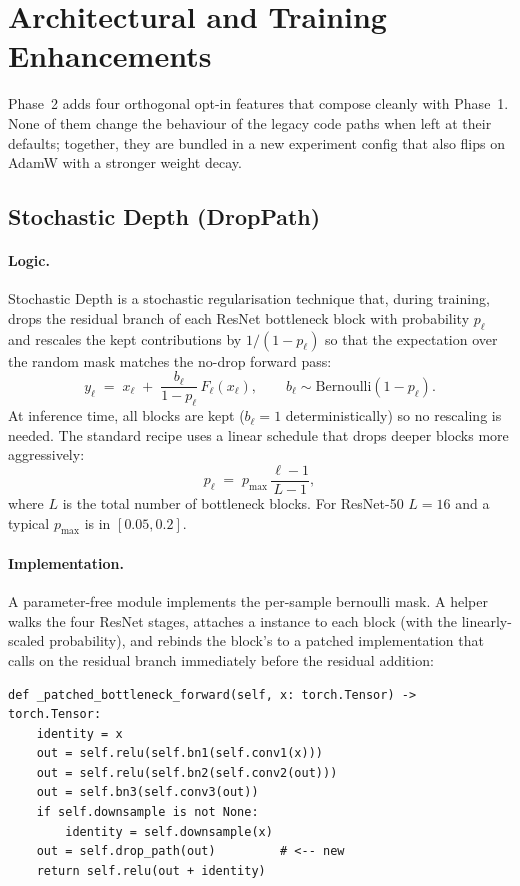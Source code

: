 \section{Architectural and Training Enhancements}
\label{sec:phase2}

Phase~2 adds four orthogonal opt-in features that compose cleanly with
Phase~1. None of them change the behaviour of the legacy code paths when
left at their defaults; together, they are bundled in a new experiment
config  that also flips on
AdamW with a stronger weight decay.

\subsection{Stochastic Depth (DropPath)}
\label{sec:phase2:droppath}

\paragraph{Logic.} Stochastic Depth \cite{Huang2016SD} is a stochastic
regularisation technique that, during training, drops the residual branch
of each ResNet bottleneck block with probability \(p_\ell\) and rescales
the kept contributions by \(1/(1-p_\ell)\) so that the expectation over
the random mask matches the no-drop forward pass:
\[
y_\ell \;=\; x_\ell \;+\;
\frac{b_\ell}{1-p_\ell}\,F_\ell(x_\ell), \qquad
b_\ell \sim \text{Bernoulli}(1-p_\ell).
\]
At inference time, all blocks are kept (\(b_\ell = 1\) deterministically)
so no rescaling is needed. The standard recipe uses a linear schedule
that drops deeper blocks more aggressively:
\[
p_\ell \;=\; p_{\max}\,\frac{\ell - 1}{L - 1},
\]
where \(L\) is the total number of bottleneck blocks. For ResNet-50
\(L=16\) and a typical \(p_{\max}\) is in \([0.05, 0.2]\).

\paragraph{Implementation.} A parameter-free  module
implements the per-sample bernoulli mask. A helper
 walks the four ResNet stages, attaches a
 instance to each block (with the linearly-scaled
probability), and rebinds the block's  to a patched
implementation that calls  on the residual
branch immediately before the residual addition:

\begin{lstlisting}[style=py]
def _patched_bottleneck_forward(self, x: torch.Tensor) -> torch.Tensor:
    identity = x
    out = self.relu(self.bn1(self.conv1(x)))
    out = self.relu(self.bn2(self.conv2(out)))
    out = self.bn3(self.conv3(out))
    if self.downsample is not None:
        identity = self.downsample(x)
    out = self.drop_path(out)         # <-- new
    return self.relu(out + identity)
\end{lstlisting}

